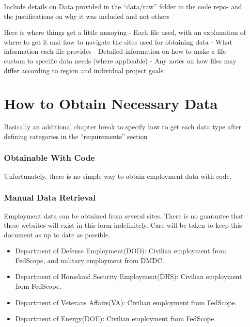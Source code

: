\documentclass[
]{book}
\begin{document}
Include details on Data provided in the ``data/raw'' folder in the code repo- and the justifications on why it was included and not others

Here is where things get a little annoying
- Each file used, with an explanation of where
to get it and how to navigate the sites used for obtaining data
- What information each file provides
- Detailed information on how to make a file custom to specific data needs (where applicable)
- Any notes on how files may differ according to region and individual project goals

\hypertarget{how-to-obtain-necessary-data}{%
\chapter{How to Obtain Necessary Data}\label{how-to-obtain-necessary-data}}

Basically an additional chapter break to specify how to get each data type after defining categories in the ``requirements'' section

\hypertarget{obtainable-with-code-1}{%
\subsection{Obtainable With Code}\label{obtainable-with-code-1}}

Unfortunately, there is no simple way to obtain employment data with code.

\hypertarget{manual-data-retrieval-1}{%
\subsection{Manual Data Retrieval}\label{manual-data-retrieval-1}}

Employment data can be obtained from several sites. There is no guarantee that these websites will exist in this form indefinitely. Care will be taken to keep this document as up to date as possible.

\begin{itemize}
\item
  Department of Defense Employment(DOD): Civilian employment from FedScope, and military employment from DMDC.
\item
  Department of Homeland Security Employment(DHS): Civilian employment from FedScope.
\item
  Department of Veterans Affairs(VA): Civilian employment from FedScope.
\item
  Department of Energy(DOE): Civilian employment from FedScope.
\end{itemize}
\end{document}
